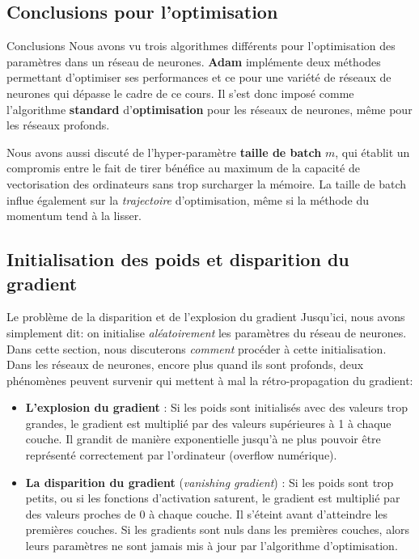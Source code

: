 \subsection[Conclusions pour l'optimisation]{Conclusions pour l'optimisation}

\begin{frame}{Conclusions}
	Nous avons vu trois algorithmes différents pour l'optimisation des paramètres dans un réseau de neurones. \textbf{Adam} implémente deux méthodes permettant d'optimiser ses performances et ce pour une variété de réseaux de neurones qui dépasse le cadre de ce cours. Il s'est donc imposé comme l'algorithme \textbf{standard} d'\textbf{optimisation} pour les réseaux de neurones, même pour les réseaux profonds.
	
	\pause
	\vspace{0.5cm}
	
	Nous avons aussi discuté de l'hyper-paramètre \textbf{taille de batch} $m$, qui établit un compromis entre le fait de tirer bénéfice au maximum de la capacité de vectorisation des ordinateurs sans trop surcharger la mémoire. La taille de batch influe également sur la \textit{trajectoire} d'optimisation, même si la méthode du momentum tend à la lisser.
\end{frame}

\subsection[Initialisation des poids et disparition du gradient]{Initialisation des poids et disparition du gradient}

\begin{frame}{Le problème de la disparition et de l'explosion du gradient}
	Jusqu'ici, nous avons simplement dit: on initialise \textit{aléatoirement} les paramètres du réseau de neurones. Dans cette section, nous discuterons  \textit{comment} procéder à cette initialisation. Dans les réseaux de neurones, encore plus quand ils sont profonds, deux phénomènes peuvent survenir qui mettent à mal la rétro-propagation du gradient:
	\pause
	\begin{itemize}
		\item \textbf{L'explosion du gradient} : Si les poids sont initialisés avec des valeurs trop grandes, le gradient est multiplié par des valeurs supérieures à 1 à chaque couche. Il grandit de manière exponentielle jusqu'à ne plus pouvoir être représenté correctement par l'ordinateur (overflow numérique).
		\pause
		\item \textbf{La disparition du gradient} (\textit{vanishing gradient}) : Si les poids sont trop petits, ou si les fonctions d'activation saturent, le gradient est multiplié par des valeurs proches de 0 à chaque couche. Il s'éteint avant d'atteindre les premières couches. Si les gradients sont nuls dans les premières couches, alors leurs paramètres ne sont jamais mis à jour par l'algorithme d'optimisation.
	\end{itemize}
\end{frame}

